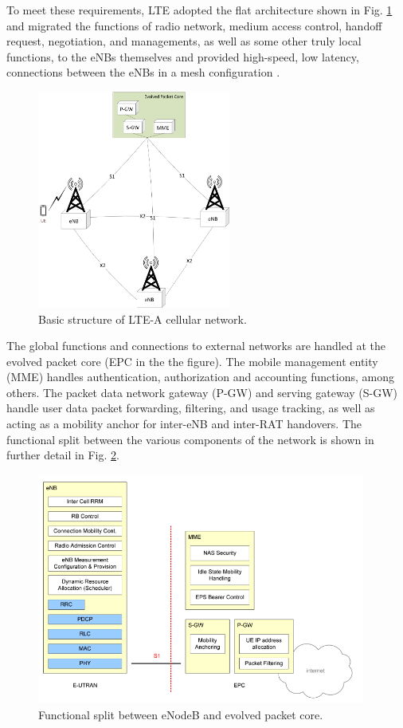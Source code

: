 To meet these requirements, LTE adopted the flat architecture shown in Fig. \ref{figs:LTE-A-Network} and migrated the functions of radio network, medium access control, handoff request, negotiation, and managements, as well as some other truly local functions, to the eNBs themselves and provided high-speed, low latency, connections between the eNBs in a mesh configuration \cite{tr36300}. 
\begin{figure}[!ht]
	\centering
	\includegraphics[width=2.5in]{figures3/lteAnet}
	\caption{Basic structure of LTE-A cellular network.}
	\label{figs:LTE-A-Network}
\end{figure}
The global functions and connections to external networks are handled at the evolved packet core (EPC in the the figure). The mobile management entity (MME) handles authentication, authorization and accounting functions, among others.  The packet data network gateway (P-GW) and serving gateway (S-GW) handle user data packet forwarding, filtering, and usage tracking, as well as acting as a mobility anchor for inter-eNB and inter-RAT handovers.  The functional split between the various components of the network is shown in further detail in Fig. \ref{figs:funcSplit}.

\begin{figure}[!ht]
	\centering
	\includegraphics[width=4.25in]{figures3/functionalsplit}
	\caption{Functional split between eNodeB and evolved packet core.}
	\label{figs:funcSplit}
\end{figure}

